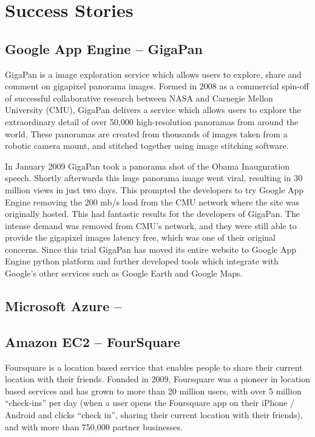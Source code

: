 \chapter{Success Stories}
\section{Google App Engine -- GigaPan}
GigaPan is a image exploration service which allows users to explore, share and comment on gigapixel panorama images. Formed in 2008 as a commercial spin-off of successful collaborative research between NASA and Carnegie Mellon University (CMU), GigaPan delivers a service which allows users to explore the extraordinary detail of over 50,000 high-resolution panoramas from around the world. These panoramas are created from thousands of images taken from a robotic camera mount, and stitched together using image stitching software\ftSgaeOne.
\ftSgaeOneText

In January 2009 GigaPan took a panorama shot of the Obama Inauguration speech. Shortly afterwards this huge panorama image went viral, resulting in 30 million views in just two days. This prompted the developers to try Google App Engine removing the 200 mb/s load from the CMU network where the site was originally hosted. This had fantastic results for the developers of GigaPan. The intense demand was removed from CMU's network, and they were still able to provide the gigapixel images latency free, which was one of their original concerns\ftSgaeTwo. Since this trial GigaPan has moved its entire website to Google App Engine python platform and further developed tools which integrate with Google's other services such as Google Earth and Google Maps\ftSgaeThree.
\ftSgaeTwoText\ftSgaeThreeText

\section{Microsoft Azure -- }

\section{Amazon EC2 -- FourSquare}
Foursquare is a location based service that enables people to share their current location with their friends.  Founded in 2009, Foursquare was a pioneer in location based services and has grown to more than 20 million users, with over 5 million ``check-ins'' per day (when a user opens the Foursquare app on their iPhone / Android and clicks ``check in'', sharing their current location with their friends), and with more than 750,000 partner businesses\ftSAmOne.
\ftSAmOneText

